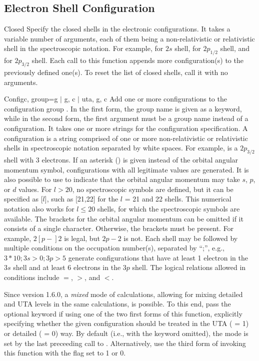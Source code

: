\subsection{Electron Shell Configuration}

\begin{fundesc}{Closed}{}
Specify the closed shells in the electronic configurations. It takes a variable
number of arguments, each of them being a non-relativistic or relativistic shell
in the spectroscopic notation. For example,  for $2s$ shell, 
for $2p_{1/2}$ shell, and  for $2p_{3/2}$ shell. Each call to this
function appends more configuration(s) to the previously defined one(s). To
reset the list of closed shells, call it with no arguments.
\end{fundesc}

\begin{fundesc}{Config}{c, group=g  $\mid$ g, c  $\mid$ uta, g, c}
Add one or more configurations to the configuration group . In the first
form, the group name  is given as a keyword, while in the second form,
the first argument must be a group name instead of a configuration. It takes one
or more strings for the configuration specification. A configuration  is
a string comprised of one or more non-relativistic or relativistic shells in
spectroscopic notation separated by white spaces. For example,  is a
$2p_{3/2}$ shell with 3 electrons. If an asterisk (\key{*}) is given instead of
the orbital angular momentum symbol, configurations with all legitimate values
are generated. It is also possible to use \key{[s,p,d]} to indicate that the
orbital angular momentum may take $s$, $p$, or $d$ values. For $l > 20$, no
spectroscopic symbols are defined, but it can be specified as [$l$], such as
[21,22] for the $l$ = 21 and 22 shells. This numerical notation also works for
$l \le 20$ shells, for which the spectroscopic symbols  are available. The brackets for the
orbital angular momentum can be omitted if it consists of a single character.
Otherwise, the brackets must be present. For example, $2[p-]2$  is legal, but
$2p-2$ is not. Each shell may be followed by multiple conditions on the
occupation number(s), separated by ``;'', e.g., $3*10;3s>0;3p>5$ generate
configurations that have at least 1 electron in the $3s$ shell and at least 6
electrons in the $3p$ shell. The logical relations allowed in conditions
include $=$, $>$, and $<$.

Since version 1.6.0, a {\em mixed} mode of calculations, allowing for mixing
detailed and UTA levels in the same calculations, is possible.  To this end,
pass the optional  keyword if using one of the two first forms of this
function, explicitly specifying whether the given configuration should be
treated in the UTA ( = 1) or detailed ( = 0) way. By default
(i.e., with the  keyword omitted), the mode is set by the last
preceeding call to . Alternatively, use the third form of
invoking this function with the  flag set to 1 or 0.
\end{fundesc}

